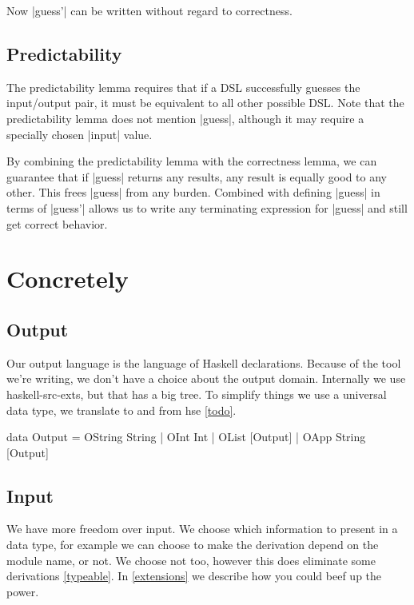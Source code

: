 \documentclass[preprint]{sigplanconf}
\begin{document}
Now |guess'| can be written without regard to correctness.

\subsection{Predictability}

The predictability lemma requires that if a DSL successfully guesses the input/output pair, it must be equivalent to all other possible DSL. Note that the predictability lemma does not mention |guess|, although it may require a specially chosen |input| value.

By combining the predictability lemma with the correctness lemma, we can guarantee that if |guess| returns any results, any result is equally good to any other. This frees |guess| from any burden. Combined with defining |guess| in terms of |guess'| allows us to write any terminating expression for |guess| and still get correct behavior.

\section{Concretely}

\subsection{Output}

Our output language is the language of Haskell declarations. Because of the tool we're writing, we don't have a choice about the output domain. Internally we use haskell-src-exts, but that has a big tree. To simplify things we use a universal data type, we translate to and from hse \ref{todo}.

\begin{code}
data Output = OString String
            | OInt Int
            | OList [Output]
            | OApp String [Output]
\end{code}

\subsection{Input}

We have more freedom over input. We choose which information to present in a data type, for example we can choose to make the derivation depend on the module name, or not. We choose not too, however this does eliminate some derivations \ref{typeable}. In \ref{extensions} we describe how you could beef up the power.
\end{document}
